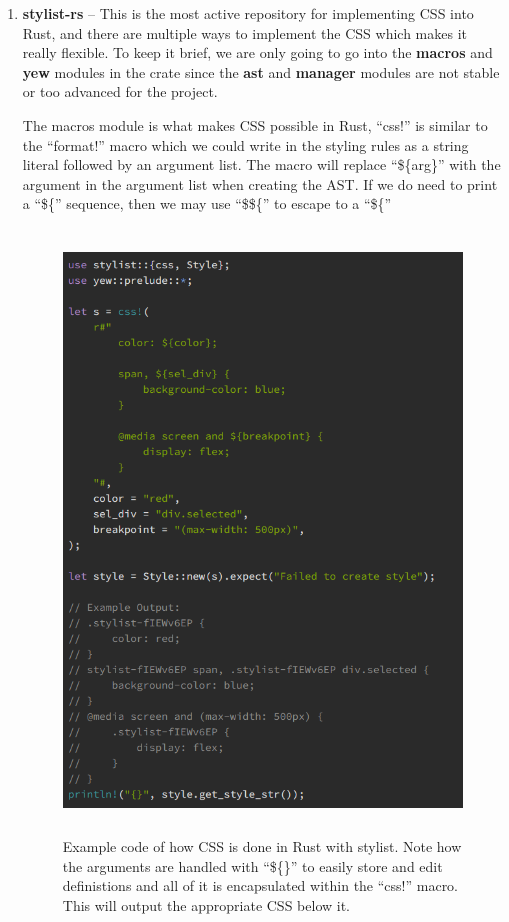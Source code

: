 \documentclass[
    paper=letter,
    parskip=half,
    fontsize=12pt,
    titlepage=firstiscover,
    toc=bibliography,
    numbers=endperiod
]{scrartcl}
\begin{document}
\begin{enumerate}
    \item
    \textbf{stylist-rs} -- This is the most active repository for
    implementing CSS into Rust, and there are multiple ways to implement
    the CSS which makes it really flexible. To keep it brief, we are only
    going to go into the \textbf{macros} and \textbf{yew} modules in the
    crate since the \textbf{ast} and \textbf{manager} modules are not stable or too
    advanced for the project.

    The macros module \cite{stylist-macros} is what makes CSS possible in Rust, ``css!'' is
    similar to the ``format!'' macro which we could write in the styling
    rules as a string literal followed by an argument list. The macro will
    replace ``\$\{arg\}'' with the argument in the argument list when
    creating the AST. If we do need to print a ``\$\{'' sequence, then we
    may use ``\$\$\{'' to escape to a ``\$\{''

    \begin{figure}[H]
        \includegraphics[height=16cm]{stylist-rust-example}
        \caption{Example code of how CSS is done in Rust with stylist. Note how the arguments are handled with ``\$\{\}'' to easily store and edit definistions and all of it is encapsulated within the ``css!'' macro. This will output the appropriate CSS below it.}
    \end{figure}


\end{enumerate}
\end{document}
